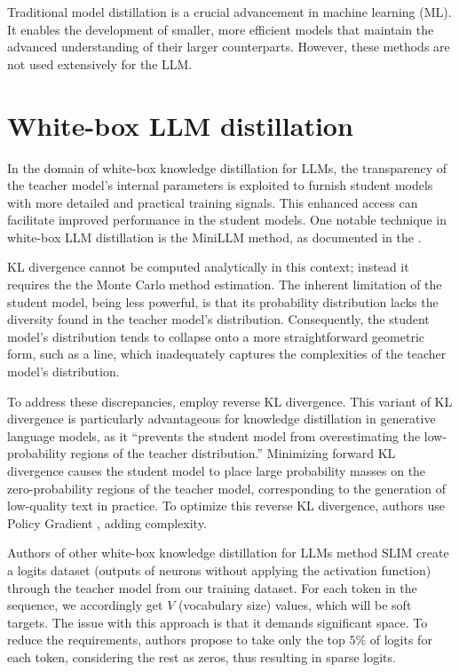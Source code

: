Traditional model distillation is a crucial advancement in machine learning (ML). It enables the development of smaller, more efficient models that maintain the advanced understanding of their larger counterparts. However, these methods are not used extensively for the LLM\@.

\section{White-box LLM distillation}
\label{section:whitebox}

In the domain of white-box knowledge distillation for LLMs, the transparency of the teacher model's internal parameters is exploited to furnish student models with more detailed and practical training signals. This enhanced access can facilitate improved performance in the student models. One notable technique in white-box LLM distillation is the MiniLLM method, as documented in the \cite{minillm}.

KL divergence cannot be computed analytically in this context; instead it requires the the Monte Carlo method \cite{montecarlo} estimation. The inherent limitation of the student model, being less powerful, is that its probability distribution lacks the diversity found in the teacher model's distribution. Consequently, the student model's distribution tends to collapse onto a more straightforward geometric form, such as a line, which inadequately captures the complexities of the teacher model's distribution.

To address these discrepancies, \citeauthor{minillm} \cite{minillm} employ reverse KL divergence. This variant of KL divergence is particularly advantageous for knowledge distillation in generative language models, as it ``prevents the student model from overestimating the low-probability regions of the teacher distribution.'' Minimizing forward KL divergence causes the student model to place large probability masses on the zero-probability regions of the teacher model, corresponding to the generation of low-quality text in practice. To optimize this reverse KL divergence, authors use Policy Gradient \cite{policy_gradient}, adding complexity.

Authors of other white-box knowledge distillation for LLMs method SLIM \cite{slim} create a logits dataset (outputs of neurons without applying the activation function) through the teacher model from our training dataset. For each token in the sequence, we accordingly get $V$ (vocabulary size) values, which will be soft targets. The issue with this approach is that it demands significant space. To reduce the requirements, authors propose to take only the top $5\%$ of logits for each token, considering the rest as zeros, thus resulting in sparse logits.


